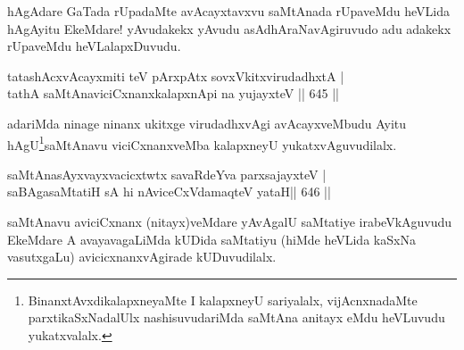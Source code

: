 \begin{artha}
hAgAdare GaTada rUpadaMte avAcayxtavxvu saMtAnada rUpaveMdu heVLida hAgAyitu EkeMdare! yAvudakekx yAvudu asAdhAraNavAgiruvudo adu adakekx rUpaveMdu heVLalapxDuvudu.
\end{artha}


\begin{shl}
tatashAcxvAcayxmiti teV pArxpAtx sovxVkitxvirudadhxtA | \\
tathA saMtAnaviciCxnanxkalapxnA\s pi na yujayxteV \hfill||  645 ||  
\end{shl}

\begin{artha}
adariMda ninage ninanx ukitxge virudadhxvAgi avAcayxveMbudu Ayitu hAgU\footnote{BinanxtAvxdikalapxneyaMte I kalapxneyU sariyalalx, vijAcnxnadaMte parxtikaSxNadalUlx nashisuvudariMda saMtAna anitayx eMdu heVLuvudu yukatxvalalx.}saMtAnavu viciCxnanxveMba kalapxneyU yukatxvAguvudilalx.
\end{artha}


\begin{shl}
\footnotemark[2]saMtAnasAyxvayxvacicxtwtx savaRdeYva parxsajayxteV | \\
saBAgasaMtatiH sA hi nAviceCxVdamaqteV yataH\hfill ||  646 ||  
\end{shl}

\begin{artha}
saMtAnavu aviciCxnanx (nitayx)veMdare yAvAgalU saMtatiye irabeVkAguvudu EkeMdare A avayavagaLiMda kUDida saMtatiyu (hiMde heVLida kaSxNa vasutxgaLu) avicicxnanxvAgirade kUDuvudilalx.
\end{artha}


